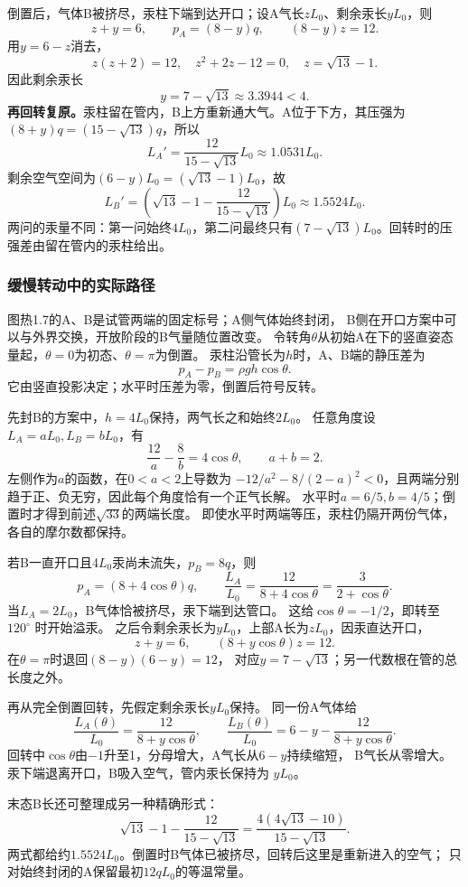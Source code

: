 \documentclass[UTF8,fontset=fandol,a4paper,11pt]{ctexart}
\newcommand{\result}[1]{\begin{equation*}\boxed{#1}\end{equation*}}
\begin{document}
倒置后，气体B被挤尽，汞柱下端到达开口；设A气长$zL_0$、剩余汞长$yL_0$，则
\[z+y=6,\qquad p_A=(8-y)q,\qquad(8-y)z=12.\]
用$y=6-z$消去，
\[z(z+2)=12,\quad z^2+2z-12=0,\quad z=\sqrt{13}-1.\]
因此剩余汞长
\[y=7-\sqrt{13}\approx3.3944<4.\]
\textbf{再回转复原。}汞柱留在管内，B上方重新通大气。A位于下方，其压强为$(8+y)q=(15-\sqrt{13})q$，所以
\[L_A'=\frac{12}{15-\sqrt{13}}L_0\approx1.0531L_0.\]
剩余空气空间为$(6-y)L_0=(\sqrt{13}-1)L_0$，故
\result{L_B'=\left(\sqrt{13}-1-\frac{12}{15-\sqrt{13}}\right)L_0
\approx1.5524L_0.}
两问的汞量不同：第一问始终$4L_0$，第二问最终只有$(7-\sqrt{13})L_0$。回转时的压强差由留在管内的汞柱给出。
\subsubsection*{缓慢转动中的实际路径}
图热1.7的A、B是试管两端的固定标号；A侧气体始终封闭，
B侧在开口方案中可以与外界交换，开放阶段的B气量随位置改变。
令转角$\theta$从初始A在下的竖直姿态量起，$\theta=0$为初态、$\theta=\pi$为倒置。
汞柱沿管长为$h$时，A、B端的静压差为
\[
p_A-p_B=\rho gh\cos\theta.
\]
它由竖直投影决定；水平时压差为零，倒置后符号反转。

先封B的方案中，$h=4L_0$保持，两气长之和始终$2L_0$。
任意角度设$L_A=aL_0,L_B=bL_0$，有
\[
\frac{12}{a}-\frac8b=4\cos\theta,\qquad a+b=2.
\]
左侧作为$a$的函数，在$0<a<2$上导数为
$-12/a^2-8/(2-a)^2<0$，且两端分别趋于正、负无穷，因此每个角度恰有一个正气长解。
水平时$a=6/5,b=4/5$；倒置时才得到前述$\sqrt{33}$的两端长度。
即使水平时两端等压，汞柱仍隔开两份气体，各自的摩尔数都保持。

若B一直开口且4$L_0$汞尚未流失，$p_B=8q$，则
\[
p_A=(8+4\cos\theta)q,\qquad
\frac{L_A}{L_0}=\frac{12}{8+4\cos\theta}
=\frac3{2+\cos\theta}.
\]
当$L_A=2L_0$，B气体恰被挤尽，汞下端到达管口。
这给$\cos\theta=-1/2$，即转至 $120^\circ$ 时开始溢汞。
之后令剩余汞长为$yL_0$，上部A长为$zL_0$，因汞直达开口，
\[
z+y=6,\qquad(8+y\cos\theta)z=12.
\]
在$\theta=\pi$时退回$(8-y)(6-y)=12$，
对应$y=7-\sqrt{13}$；另一代数根在管的总长度之外。

再从完全倒置回转，先假定剩余汞长$yL_0$保持。
同一份A气体给
\[
\frac{L_A(\theta)}{L_0}=\frac{12}{8+y\cos\theta},\qquad
\frac{L_B(\theta)}{L_0}=6-y-\frac{12}{8+y\cos\theta}.
\]
回转中$\cos\theta$由$-1$升至1，分母增大，A气长从$6-y$持续缩短，
B气长从零增大。汞下端退离开口，B吸入空气，管内汞长保持为 $yL_0$。

末态B长还可整理成另一种精确形式：
\[
\sqrt{13}-1-\frac{12}{15-\sqrt{13}}
=\frac{4(4\sqrt{13}-10)}{15-\sqrt{13}}.
\]
两式都给约$1.5524L_0$。倒置时B气体已被挤尽，回转后这里是重新进入的空气；
只对始终封闭的A保留最初$12qL_0$的等温常量。
\end{document}
